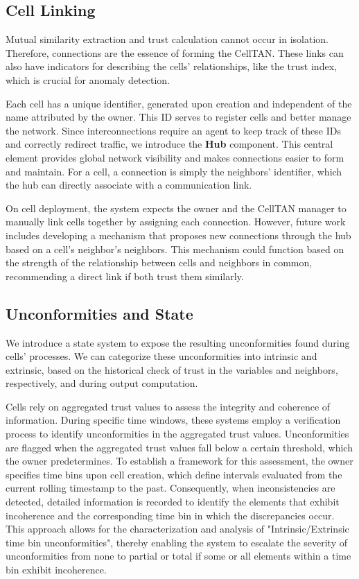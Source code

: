 \subsection{Cell Linking}

Mutual similarity extraction and trust calculation cannot occur in isolation. Therefore, connections are the essence of forming the CellTAN. These links can also have indicators for describing the cells' relationships, like the trust index, which is crucial for anomaly detection.

Each cell has a unique identifier, generated upon creation and independent of the name attributed by the owner. This ID serves to register cells and better manage the network. Since interconnections require an agent to keep track of these IDs and correctly redirect traffic, we introduce the \textbf{Hub} component. This central element provides global network visibility and makes connections easier to form and maintain. For a cell, a connection is simply the neighbors' identifier, which the hub can directly associate with a communication link.

On cell deployment, the system expects the owner and the CellTAN manager to manually link cells together by assigning each connection. However, future work includes developing a mechanism that proposes new connections through the hub based on a cell's neighbor's neighbors. This mechanism could function based on the strength of the relationship between cells and neighbors in common, recommending a direct link if both trust them similarly.

\subsection{Unconformities and State} \label{sec:states}

We introduce a state system to expose the resulting unconformities found during cells' processes. We can categorize these unconformities into intrinsic and extrinsic, based on the historical check of trust in the variables and neighbors, respectively, and during output computation.

Cells rely on aggregated trust values to assess the integrity and coherence of information. During specific time windows, these systems employ a verification process to identify unconformities in the aggregated trust values. Unconformities are flagged when the aggregated trust values fall below a certain threshold, which the owner predetermines. To establish a framework for this assessment, the owner specifies time bins upon cell creation, which define intervals evaluated from the current rolling timestamp to the past. Consequently, when inconsistencies are detected, detailed information is recorded to identify the elements that exhibit incoherence and the corresponding time bin in which the discrepancies occur. This approach allows for the characterization and analysis of "Intrinsic/Extrinsic time bin unconformities", thereby enabling the system to escalate the severity of unconformities from none to partial or total if some or all elements within a time bin exhibit incoherence.

